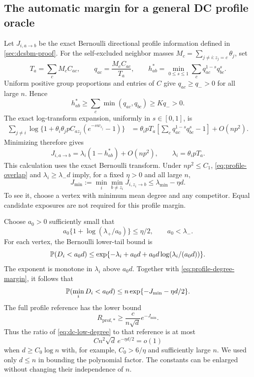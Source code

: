 \subsection{The automatic margin for a general DC profile oracle}

Let $J_{i,a\to b}$ be the exact Bernoulli directional profile information
defined in \cref{sec:dcsbm-proof}. For the self-excluded neighbor masses
$M_c=\sum_{j\ne i:z_j=c}\theta_j$, set
\[
 T_a=\sum_cM_cC_{ac},\qquad
 q_{ac}=\frac{M_cC_{ac}}{T_a},\qquad
 h_{ab}^*=\min_{0\le s\le1}\sum_cq_{ac}^{1-s}q_{bc}^s.
\]
Uniform positive group proportions and entries of $C$ give
$q_{ac}\ge q_->0$ for all large $n$. Hence
\begin{equation}\label{eq:profile-overlap}
 h_{ab}^*\ge\sum_c\min(q_{ac},q_{bc})\ge Kq_->0.
\end{equation}
The exact log-transform expansion, uniformly in $s\in[0,1]$, is
\begin{align*}
 \sum_{j\ne i}\log\{1+\theta_i\theta_jpC_{az_j}
                    (e^{-sw_{z_j}}-1)\}
 &=\theta_ipT_a
       \left[\sum_cq_{ac}^{1-s}q_{bc}^s-1\right]+O(np^2).
\end{align*}
Minimizing therefore gives
\begin{equation}\label{eq:profile-leading-information}
 J_{i,a\to b}
 =\lambda_i(1-h_{ab}^*)+O(np^2),
 \qquad \lambda_i=\theta_ipT_a.
\end{equation}
This calculation uses the exact Bernoulli transform.
Under $np^2\le C_1$, \eqref{eq:profile-overlap} and
$\lambda_i\ge\lambda_-d$ imply, for a fixed $\eta>0$ and all large $n$,
\begin{equation}\label{eq:profile-degree-margin}
 J_{\min}:=\min_i\min_{b\ne z_i}J_{i,z_i\to b}
 \le\lambda_{\min}-\eta d.
\end{equation}
To see it, choose a vertex with minimum mean degree and any competitor.
Equal candidate exposures are not required for this profile margin.

Choose $a_0>0$ sufficiently small that
\[
 a_0\{1+\log(\lambda_+/a_0)\}\le\eta/2,\qquad a_0<\lambda_-.
\]
For each vertex, the Bernoulli lower-tail bound is
\[
 \mathbb P(D_i<a_0d)
 \le\exp\{-\lambda_i+a_0d+
                   a_0d\log(\lambda_i/(a_0d))\}.
\]
The exponent is monotone in $\lambda_i$ above $a_0d$.
Together with \eqref{eq:profile-degree-margin}, it follows that
\begin{equation}\label{eq:dc-low-degree}
 \mathbb P(\min_iD_i<a_0d)
 \le n\exp\{-J_{\min}-\eta d/2\}.
\end{equation}
The full profile reference has the lower bound
\[
 R_{\mathrm{prof},*}\ge
 \frac c{n\sqrt d}e^{-J_{\min}}.
\]
Thus the ratio of \eqref{eq:dc-low-degree} to that reference is at most
\[
 Cn^2\sqrt d\,e^{-\eta d/2}=o(1)
\]
when $d\ge C_0\log n$ with, for example, $C_0>6/\eta$ and sufficiently
large $n$. We used only $d\le n$ in bounding the polynomial factor.
The constants can be enlarged without changing their independence of $n$.

